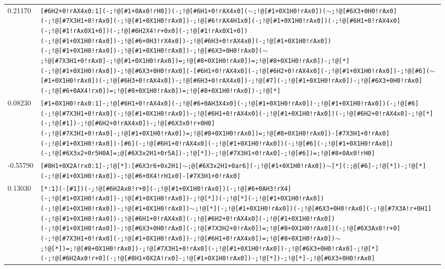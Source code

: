 \begin{longtable}{>{\baselineskip=10pt}p{} >{\baselineskip=10pt}p{}}
0.21170 & \texttt{[\#6H2+0!rAX4x0:1](-;!@[\#1+0Ax0!rH0])(-;!@[\#6H1+0!rAX4x0]($\sim$;!@[\#1+0X1H0!rAx0])($\sim$;!@[\#6X3+0H0!rAx0](-;!@[\#7X3H1+0!rAx0](-;!@[\#1+0X1H0!rAx0])-;!@[\#6!rAX4H1x0](-;!@[\#1+0X1H0!rAx0])(-;!@[\#6H1+0!rAX4x0](-;!@[\#1!rAx0X1+0])(-;!@[\#6H2X4!r+0x0](-;!@[\#1!rAx0X1+0])(-;!@[\#1+0X1H0!rAx0])-;!@[\#6+0H3!rX4x0])-;!@[\#6H3+0!rAX4x0](-;!@[\#1+0X1H0!rAx0])(-;!@[\#1+0X1H0!rAx0])-;!@[\#1+0X1H0!rAx0])-;!@[\#6X3+0H0!rAx0]($\sim$;!@[\#7X3H1+0!rAx0]-;!@[\#1+0X1H0!rAx0])=;!@[\#8+0X1H0!rAx0])=;!@[\#8+0X1H0!rAx0])-;!@[*](-;!@[\#1+0X1H0!rAx0])-;!@[\#6X3+0H0!rAx0](-[\#6H1+0!rAX4x0](-;!@[\#6H2+0!rAX4x0](-;!@[\#1+0X1H0!rAx0])-;!@[\#6]($\sim$[\#1+0X1H0!rAx0])(-;!@[\#6H3+0!rAX4x0])-;!@[\#6H3+0!rAX4x0])-;!@[\#7](-;!@[\#1+0X1H0!rAx0])-;!@[\#6X3+0H0!rAx0](-;!@[\#6+0AX4!rx0])=;!@[\#8+0X1H0!rAx0])=;!@[\#8+0X1H0!rAx0])-;!@[*]} \\ 
0.08230 & \texttt{[\#1+0X1H0!rAx0:1]-;!@[\#6H1+0!rAX4x0](-;!@[\#6+0AH3X4x0](-;!@[\#1+0X1H0!rAx0])-;!@[\#1+0X1H0!rAx0])(-;!@[\#6](-;!@[\#7X3H1+0!rAx0](-;!@[\#1+0X1H0!rAx0])-;!@[\#6H1+0!rAX4x0](-;!@[\#1+0X1H0!rAx0])(-;!@[\#6H2+0!rAX4x0]-;!@[*](-;!@[\#1])-;!@[\#6H2+0!rAX4x0])-;!@[\#6X3x0!r+0H0](-;!@[\#7X3H1+0!rAx0]-;!@[\#1+0X1H0!rAx0])=;!@[\#8+0X1H0!rAx0])=;!@[\#8+0X1H0!rAx0])-[\#7X3H1+0!rAx0](-;!@[\#1+0X1H0!rAx0])-[\#6](-;!@[\#6H1+0!rAX4x0](-;!@[\#1+0X1H0!rAx0])(-;!@[\#6](-;!@[\#1+0X1H0!rAx0])(-;!@[\#6X3x2+0r5H0A]=;@[\#6X3x2H1+0r5A])-;!@[*])-;!@[\#7X3H1+0!rAx0]-;!@[\#6])=;!@[\#8+0Ax0!rH0]} \\ 
-0.55790 & \texttt{[\#8H1+0X2A!rx0:1]-;!@[*]:[\#6X3r6+0x2H1]$\sim$;@[\#6X3x2H1+0ar6](-;!@[\#1+0X1H0!rAx0])$\sim$[*](:;@[\#6]-;!@[*])-;!@[*](-;!@[\#1+0X1H0!rAx0])-;!@[\#6+0X4!rH1x0]-[\#7X3H1+0!rAx0]} \\ 
0.13030 & \texttt{[*:1](-[\#1])(-;!@[\#6H2Ax0!r+0](-;!@[\#1+0X1H0!rAx0])(-;!@[\#6+0AH3!rX4](-;!@[\#1+0X1H0!rAx0])-;!@[\#1+0X1H0!rAx0])-;!@[*])(-;!@[*](-;!@[\#1+0X1H0!rAx0])(-;!@[\#1+0X1H0!rAx0])-;!@[\#1+0X1H0!rAx0])$\sim$;!@[*](-;!@[\#1+0X1H0!rAx0])(-;!@[\#6X3+0H0!rAx0](-;!@[\#7X3A!r+0H1](-;!@[\#1+0X1H0!rAx0])-;!@[\#6H1+0!rAX4x0](-;!@[\#6H2+0!rAX4x0](-;!@[\#1+0X1H0!rAx0])(-;!@[\#1+0X1H0!rAx0])-;!@[\#6X3+0H0!rAx0](-;!@[\#7X3H2+0!rAx0])=;!@[\#8+0X1H0!rAx0])(-;!@[\#6X3Ax0!r+0](-;!@[\#7X3H1+0!rAx0](-;!@[\#1+0X1H0!rAx0])-;!@[\#6H1+0!rAX4x0])=;!@[\#8+0X1H0!rAx0])$\sim$;!@[*])=;!@[\#8+0X1H0!rAx0])-;!@[\#7X3H1+0!rAx0](-;!@[\#1+0X1H0!rAx0])-;!@[\#6X3+0H0!rAx0]-;!@[*](-;!@[\#6H2Ax0!r+0](-;!@[\#8H1+0X2A!rx0]-;!@[\#1+0X1H0!rAx0])-;!@[*])-;!@[*]-;!@[\#6X3+0H0!rAx0]} \\ 

\end{longtable}
